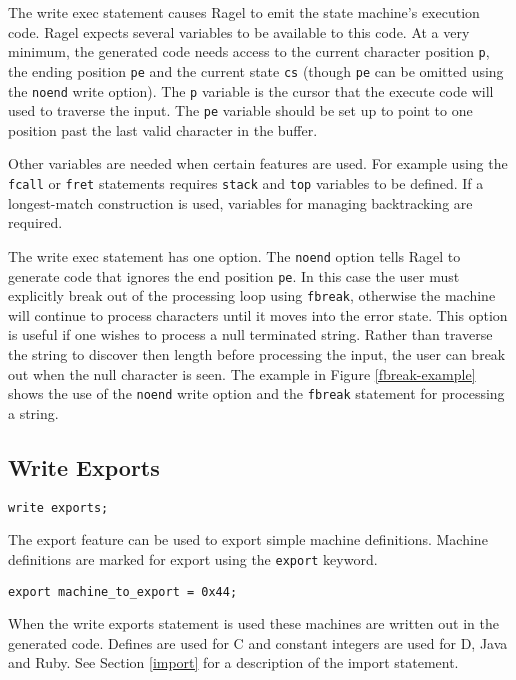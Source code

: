 \documentclass[letterpaper,11pt,oneside]{book}
\newcommand{\verbspace}{\vspace{10pt}}
\begin{document}
The write exec statement causes Ragel to emit the state machine's execution code.
Ragel expects several variables to be available to this code. At a very minimum, the
generated code needs access to the current character position \verb|p|, the ending
position \verb|pe| and the current state \verb|cs| (though \verb|pe|
can be omitted using the \verb|noend| write option).
The \verb|p| variable is the cursor that the execute code will
used to traverse the input. The \verb|pe| variable should be set up to point to one
position past the last valid character in the buffer.

Other variables are needed when certain features are used. For example using
the \verb|fcall| or \verb|fret| statements requires \verb|stack| and
\verb|top| variables to be defined. If a longest-match construction is used,
variables for managing backtracking are required.

The write exec statement has one option. The \verb|noend| option tells Ragel
to generate code that ignores the end position \verb|pe|. In this
case the user must explicitly break out of the processing loop using
\verb|fbreak|, otherwise the machine will continue to process characters until
it moves into the error state. This option is useful if one wishes to process a
null terminated string. Rather than traverse the string to discover then length
before processing the input, the user can break out when the null character is
seen.  The example in Figure \ref{fbreak-example} shows the use of the
\verb|noend| write option and the \verb|fbreak| statement for processing a string.

\subsection{Write Exports}
\label{export}

\begin{verbatim}
write exports;
\end{verbatim}
\verbspace

The export feature can be used to export simple machine definitions. Machine definitions
are marked for export using the \verb|export| keyword.

\verbspace
\begin{verbatim}
export machine_to_export = 0x44;
\end{verbatim}
\verbspace

When the write exports statement is used these machines are 
written out in the generated code. Defines are used for C and constant integers
are used for D, Java and Ruby. See Section \ref{import} for a description of the
import statement.
\end{document}
